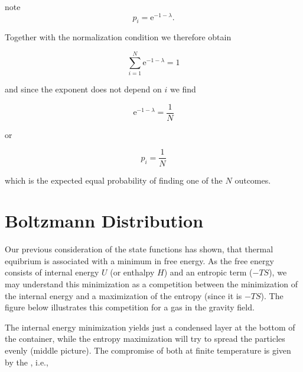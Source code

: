 \documentclass[letterpaper,10pt,english]{sphinxmanual}
\let\sphinxpxdimen\pdfpxdimen\else\newdimen\sphinxpxdimen
\begin{document}
\begin{sphinxadmonition}{note}{}
\sphinxAtStartPar
\begin{equation}
p_{i}=\mathrm{e}^{-1-\lambda}.
\end{equation}

\sphinxAtStartPar
Together with the normalization condition we therefore obtain

\sphinxAtStartPar
\begin{equation}
\sum_{i=1}^{N} \mathrm{e}^{-1-\lambda}=1
\end{equation}

\sphinxAtStartPar
and since the exponent does not depend on \(i\) we find

\sphinxAtStartPar
\begin{equation}
\mathrm{e}^{-1-\lambda}=\frac{1}{N}
\end{equation}

\sphinxAtStartPar
or

\sphinxAtStartPar
\begin{equation}
p_{i}=\frac{1}{N}
\end{equation}

\sphinxAtStartPar
which is the expected equal probability of finding one of the \(N\) outcomes.
\end{sphinxadmonition}


\section{Boltzmann Distribution}
\label{\detokenize{notebooks/L2/3_Statistical_Physics_Definitions:Boltzmann-Distribution}}
\sphinxAtStartPar
Our previous consideration of the state functions has shown, that thermal equibrium is associated with a minimum in free energy. As the free energy consists of internal energy \(U\) (or enthalpy \(H\)) and an entropic term (\(-TS\)), we may understand this minimization as a competition between the minimization of the internal energy and a maximization of the entropy (since it is \(-TS\)). The figure below illustrates this competition for a gas in the gravity field.

\noindent\sphinxincludegraphics[width=500\sphinxpxdimen,height=295\sphinxpxdimen]{{entropy_comp}.png}

\sphinxAtStartPar
The internal energy minimization yields just a condensed layer at the bottom of the container, while the entropy maximization will try to spread the particles evenly (middle picture). The compromise of both at finite temperature is given by the , i.e.,
\end{document}
